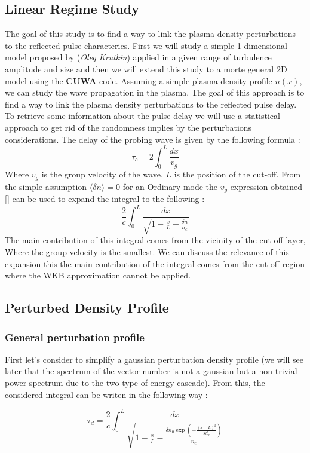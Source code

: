 \documentclass[11pt,a4paper,openany]{report}
\begin{document}
\begin{multicols}{2}
    \section{Linear Regime Study}
    The goal of this study is to find a way to link the plasma density perturbations to the reflected pulse characterics. First we will study a simple 1 dimensional model proposed by (\emph{Oleg Krutkin}) applied in a given range of turbulence amplitude and size and then we will extend this study to a morte general 2D model using the \textbf{CUWA} code.
    Assuming a simple plasma density profile $n(x)$, we can study the wave propagation in the plasma. The goal of this approach is to find a way to link the plasma density perturbations to the reflected pulse delay. To retrieve some information about the pulse delay we will
    use a statistical approach to get rid of the randomness implies by the perturbations considerations.
    The delay of the probing wave is given by the following formula  : $$\tau_c = 2 \int_0^L \frac{dx}{v_g}$$ Where $v_g$ is the group velocity of the wave, $L$ is the position of the cut-off.
    From the simple assumption $\langle \delta n \rangle = 0 $ for an Ordinary mode the  $v_g$ expression obtained [] can be used to expand the integral to the following :
    $$\frac{2}{c} \int_0^L \frac{dx}{\sqrt{1 - \frac{x}{L} - \frac{\delta n }{n_c}}}$$ The main contribution of this integral comes from the vicinity of the cut-off layer, Where the group velocity is the smallest.
    We can discuss the relevance of this expansion this the main contribution of the integral comes from the cut-off region where the WKB approximation cannot be applied.

    \subsection{Perturbed Density Profile}
    \subsubsection{General perturbation profile}
    First let's consider to simplify a gaussian perturbation density profile (we will see later that the spectrum of the vector number is not a gaussian but a non trivial power spectrum due to the two type of energy cascade). From this, the considered integral can be writen in the following way :

    $$\tau_d = \frac{2}{c} \int_0^L \frac{dx}{\sqrt{1 - \frac{x}{L} - \frac{\delta n_0  \exp(-\frac{(x - L)^2}{8l_{cx}^2})}{n_c}}}$$


\end{multicols}
\end{document}
